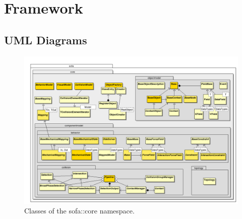 
\section{Framework}

\subsection{UML Diagrams}

\begin{figure}[h]
\centering
\includegraphics[width=\linewidth]{uml-sofa-core.png}
\caption{Classes of the sofa::core namespace.}
\label{fig:uml-sofa-core}
\end{figure}
